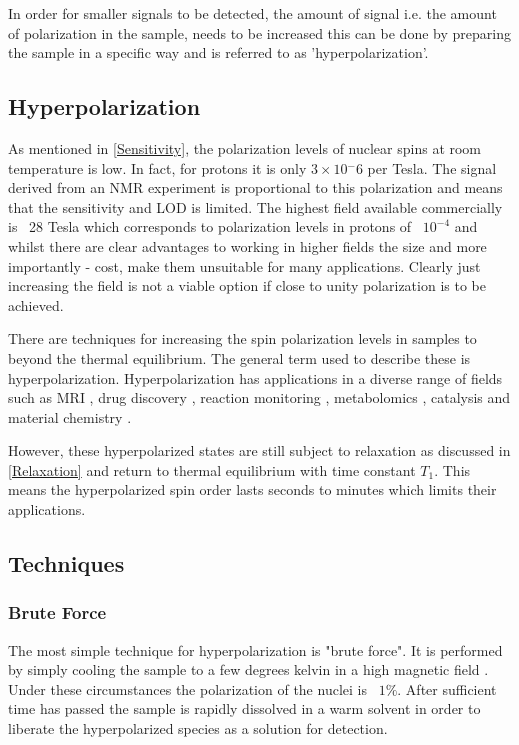 In order for smaller signals to be detected, the amount of signal i.e. the amount of polarization in the sample,
needs to be increased this can be done by preparing the sample in a specific way and is referred to as
'hyperpolarization'.

\subsection{Hyperpolarization}

 As mentioned in \ref{Sensitivity}, the polarization levels of nuclear spins at room temperature is low. In fact,
 for protons it is only $3\times10{^-6}$ per Tesla\citep{RN138}. The signal derived from an NMR experiment
 is proportional to this polarization and means that the sensitivity and LOD is limited. The highest
 field available commercially is ~28 Tesla which corresponds to polarization levels in protons of ~$10^{-4}$ and
 whilst there are clear advantages to working in higher fields the size and more importantly - cost, make them
 unsuitable for many applications. Clearly just increasing the field is not a viable
 option if close to unity polarization is to be
 achieved.

 There are techniques for increasing the spin polarization levels in samples to beyond the thermal
 equilibrium. The general term used to describe these is hyperpolarization. Hyperpolarization has
 applications in a diverse range of fields such as MRI \citep{RN139,RN140,RN151,RN152}, drug discovery
 \citep{RN141,RN142}, reaction monitoring \citep{RN143,RN144,RN145}, metabolomics \citep{RN147,RN148},
 catalysis\citep{RN149, RN150} and material chemistry \citep{RN153,piveteau2015structure,RN154}.

 However, these hyperpolarized states are still subject to relaxation as discussed in \ref{Relaxation} and
 return to thermal equilibrium with time constant $T_1$. This means the hyperpolarized spin order lasts seconds
 to minutes which limits their applications.

 \subsection{Techniques}

 \subsubsection{Brute Force}

 The most simple technique for hyperpolarization is "brute force". It is performed by simply
 cooling the sample to a few degrees kelvin in a high magnetic field \citep{RN155,RN157}. Under
 these circumstances the polarization of the nuclei is ~$1\%$. After sufficient time has passed
 the sample is rapidly dissolved in a warm solvent in order to liberate the hyperpolarized
 species as a solution for detection.


